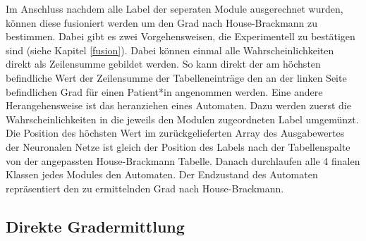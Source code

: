 Im Anschluss nachdem alle Label der seperaten Module ausgerechnet wurden, können diese fusioniert werden um den Grad nach House-Brackmann zu bestimmen. Dabei gibt es zwei Vorgehensweisen, die Experimentell zu bestätigen sind (siehe Kapitel \ref{fusion}). Dabei können einmal alle Wahrscheinlichkeiten direkt als Zeilensumme gebildet werden. So kann direkt der am höchsten befindliche Wert der Zeilensumme der Tabelleneinträge den an der linken Seite befindlichen Grad für einen Patient*in angenommen werden. Eine andere Herangehensweise ist das heranziehen eines Automaten. Dazu werden zuerst die Wahrscheinlichkeiten in die jeweils den Modulen zugeordneten Label umgemünzt. Die Position des höchsten Wert im zurückgelieferten Array des Ausgabewertes der Neuronalen Netze ist gleich der Position des Labels nach der Tabellenspalte von der angepassten House-Brackmann Tabelle. Danach durchlaufen alle 4 finalen Klassen jedes Modules den Automaten. Der Endzustand des Automaten repräsentiert den zu ermittelnden Grad nach House-Brackmann.


\subsection{Direkte Gradermittlung}\label{direct_grade}















\clearpage
